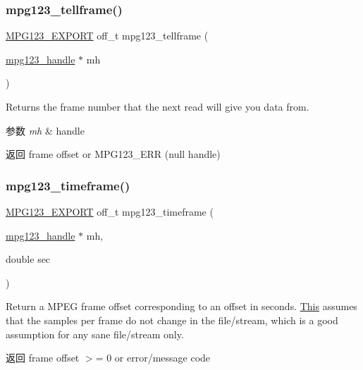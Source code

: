 \subsubsection{\texorpdfstring{mpg123\+\_\+tellframe()}{mpg123\_tellframe()}}
{\footnotesize\ttfamily \hyperlink{mpg123_8h_a2ba98cfba3f760879df70e755b2a61cc}{M\+P\+G123\+\_\+\+E\+X\+P\+O\+RT} off\+\_\+t mpg123\+\_\+tellframe (\begin{DoxyParamCaption}\item[{\hyperlink{group__mpg123__init_ga6728e2839a395f3a07d4514da659faca}{mpg123\+\_\+handle} $\ast$}]{mh }\end{DoxyParamCaption})}

Returns the frame number that the next read will give you data from. 
\begin{DoxyParams}{参数}
{\em mh} & handle \\
\hline
\end{DoxyParams}
\begin{DoxyReturn}{返回}
frame offset or M\+P\+G123\+\_\+\+E\+RR (null handle) 
\end{DoxyReturn}
\mbox{\label{group__mpg123__seek_gab6c3b85832ef3de29aafdb0ef790043b}} 
\subsubsection{\texorpdfstring{mpg123\+\_\+timeframe()}{mpg123\_timeframe()}}
{\footnotesize\ttfamily \hyperlink{mpg123_8h_a2ba98cfba3f760879df70e755b2a61cc}{M\+P\+G123\+\_\+\+E\+X\+P\+O\+RT} off\+\_\+t mpg123\+\_\+timeframe (\begin{DoxyParamCaption}\item[{\hyperlink{group__mpg123__init_ga6728e2839a395f3a07d4514da659faca}{mpg123\+\_\+handle} $\ast$}]{mh,  }\item[{double}]{sec }\end{DoxyParamCaption})}

Return a M\+P\+EG frame offset corresponding to an offset in seconds. \hyperlink{namespace_this}{This} assumes that the samples per frame do not change in the file/stream, which is a good assumption for any sane file/stream only. \begin{DoxyReturn}{返回}
frame offset $>$= 0 or error/message code 
\end{DoxyReturn}

